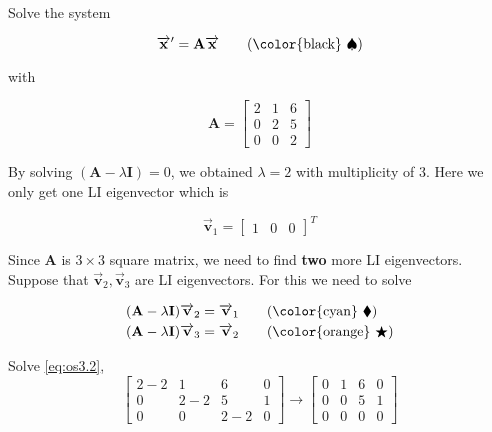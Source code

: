 \begin{example}
    Solve the system 

    \begin{equation*}
        \overrightarrow{\mathbf{x}}' = \mathbf{A}\overrightarrow{\mathbf{x}} \label{eq:os3.0} \tag{{\color{black} $\spadesuit $}}
    \end{equation*}

    with
    
    \[
        \mathbf{A} = \begin{bmatrix}
            2 & 1 & 6\\ 0 & 2 & 5\\ 0 & 0 & 2
        \end{bmatrix}
    \]
\end{example}
\begin{solution}
    By solving $(\mathbf{A} - \lambda \mathbf{I}) = 0$, we obtained $\lambda = 2$ with multiplicity of 3.
    Here we only get one LI eigenvector which is 

    \[
        \overrightarrow{\mathbf{v}}_1 = \begin{bmatrix}
            1 & 0 & 0
        \end{bmatrix} ^ T
    \]

    Since $\mathbf{A}$ is $3\times 3$ square matrix, we need to find \textbf{two} more LI eigenvectors. Suppose 
    that $\overrightarrow{\mathbf{v}}_2, \overrightarrow{\mathbf{v}}_3$ are LI eigenvectors. For this we need to solve 

    \begin{align*}
        &(\mathbf{A} - \lambda \mathbf{I})\overrightarrow{\mathbf{v}}_2 = \overrightarrow{\mathbf{v}}_1 \label{eq:os3.1} \tag{{\color{cyan} $\blacklozenge$}} \\
        &(\mathbf{A} - \lambda \mathbf{I})\overrightarrow{\mathbf{v}}_3 = \overrightarrow{\mathbf{v}}_2 \label{eq:os3.2} \tag{{\color{orange} $\bigstar  $}}
    \end{align*}

    Solve \eqref{eq:os3.2}, 
    \begin{equation*}
        \left[
        \begin{array}{ccc|c}
        2-2 & 1 & 6 & 0\\
        0 & 2-2 & 5 & 1\\
        0 & 0 & 2-2 & 0
        \end{array}
        \right] \xrightarrow[]{}
        \left[
        \begin{array}{ccc|c}
            0 & 1 & 6 & 0\\
            0 & 0 & 5 & 1\\
            0 & 0 & 0 & 0
        \end{array}
        \right]
    \end{equation*}


\end{solution}
